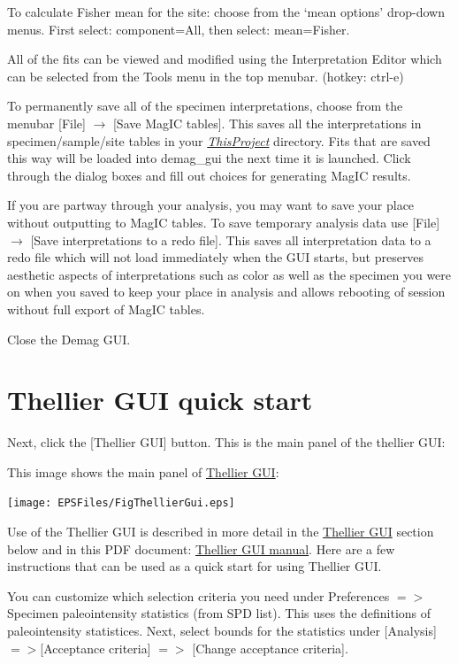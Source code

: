 \documentclass[11pt]{book}
\begin{document}
{To calculate  Fisher mean for the site: choose from the `mean options' drop-down menus.  First select: component=All, then select: mean=Fisher.

All of the fits can be viewed and modified using the Interpretation Editor which can be selected from the Tools menu in the top menubar. (hotkey: ctrl-e)

To permanently save all of the specimen interpretations, choose from the menubar [File] $\rightarrow$ [Save MagIC  tables]. This saves all the interpretations in specimen/sample/site tables in your \href{#Project_Directory}{\it ThisProject} directory. Fits that are saved this way will be loaded into demag\_gui the next time it is launched.  Click through the dialog boxes and fill out choices for generating MagIC results.

If you are partway through your analysis, you may want to save your place without outputting to MagIC tables.  To save temporary analysis data use [File] $\rightarrow$ [Save interpretations to a redo file]. This saves all interpretation data to a redo file which will not load immediately when the GUI starts, but preserves aesthetic aspects of interpretations such as color as well as the specimen you were on when you saved to keep your place in analysis and allows rebooting of session without full export of MagIC tables.

Close the Demag GUI.



\section{Thellier GUI quick start}
Next, click the [Thellier GUI] button.  This is the main panel of the thellier GUI:

This image shows the main panel of \href{#ThellierGUI}{Thellier GUI}:

\texttt{[image: EPSFiles/FigThellierGui.eps]}

Use of the Thellier GUI is described in more detail in the \href{#thellier_GUI.py}{Thellier GUI} section below and in this PDF document: \href{https://github.com/PmagPy/PmagPy-Cookbook/blob/gh-pages/thellier_GUI_full_manual.pdf}{Thellier GUI manual}. Here are a few instructions that can be used as a quick start for using Thellier GUI.

You can customize which selection criteria you need  under Preferences $=>$ Specimen paleointensity statistics (from SPD list).  This uses the \cite{paterson14} definitions of paleointensity statistices.
Next, select bounds for the statistics under [Analysis] $=>$[Acceptance criteria] $=>$ [Change acceptance criteria].

}
\end{document}

